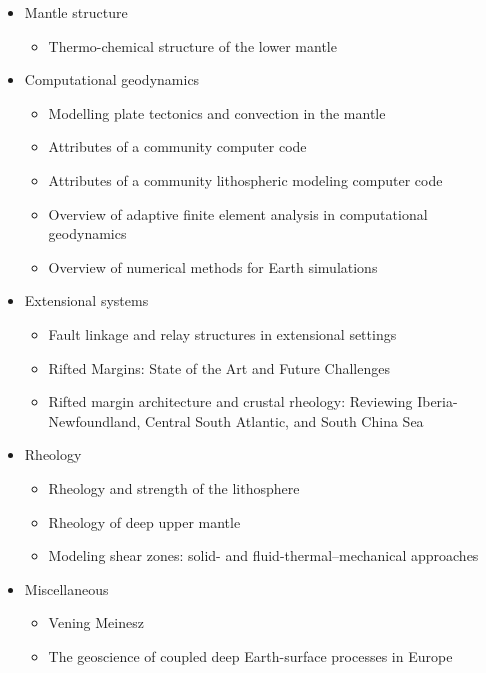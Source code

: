 \begin{itemize}
\item Mantle structure
   \begin{itemize}
   \item Thermo-chemical structure of the lower mantle \cite{dett07}
   \end{itemize}


\item Computational geodynamics
   \begin{itemize}
   \item Modelling plate tectonics and convection in the mantle \cite{mogz00}
   \item Attributes of a community computer code \cite{comc15}
   \item Attributes of a community lithospheric modeling computer code \cite{comc15}
   \item Overview of adaptive finite element analysis in computational geodynamics \cite{masm13}
   \item Overview of numerical methods for Earth simulations \cite{momd01}
   \end{itemize}

\item Extensional systems
   \begin{itemize}
   \item Fault linkage and relay structures in extensional settings \cite{foro16}
   \item Rifted Margins: State of the Art and Future Challenges \cite{pema19}\\
   \item Rifted margin architecture and crustal rheology: Reviewing
Iberia-Newfoundland, Central South Atlantic, and South China Sea \cite{brhc17}
   \end{itemize}

\item Rheology
   \begin{itemize}
   \item Rheology and strength of the lithosphere \cite{kirb83,buro11}
   \item Rheology of deep upper mantle \cite{kara10}
   \item Modeling shear zones: solid- and fluid-thermal–mechanical approaches \cite{reyu03}
   \end{itemize}

\item Miscellaneous
   \begin{itemize}
   \item Vening Meinesz \cite{vlaa89}
   \item The geoscience of coupled deep Earth-surface processes in Europe \cite{clzb07}
   \end{itemize}



\end{itemize}
